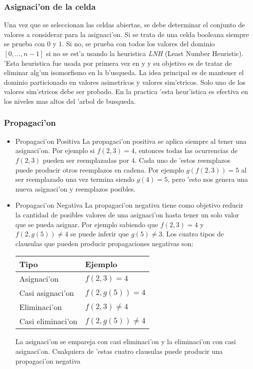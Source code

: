 \subsubsection{Asignaci'on de la celda}
Una vez que se seleccionan las celdas abiertas, se debe determinar el conjunto de valores a considerar para la asignaci'on. Si se trata de una celda booleana siempre se prueba con $0$ y $1$. Si no, se prueba con todos los valores del dominio $[0,\dots,n-1]$ si no se est'a usando la heuristica \textit{LNH} (Least Number Heuristic). 'Esta heuristica fue usada por primera vez en \cite{zhang96} y \cite{zhang} y su objetivo es de tratar de eliminar alg'un isomorfismo en la b'usqueda. La idea principal es de mantener el dominio particionado en valores asimetricos y valores sim'etricos. Solo uno de los valores sim'etricos debe ser probado. En la practica 'esta heur'istica es efectiva en los niveles mas altos del 'arbol de busqueda.


\subsubsection{Propagaci'on}

\begin{itemize}

\item{Propagaci'on Positiva}
La propagaci'on positiva se aplica siempre al tener una asignaci'on. Por ejemplo si $f(2,3)=4$, entonces todas las ocurrencias de $f(2,3)$ pueden ser reemplazadas por $4$. Cada uno de 'estos reemplazos puede producir otros reemplazos en cadena. Por ejemplo $g(f(2,3))=5$ al ser reemplazado una vez termina siendo $g(4)=5$, pero 'esto nos genera una nueva asignaci'on y reemplazos posibles.

\item{Propagaci'on Negativa}
La propagaci'on negativa tiene como objetivo reducir la cantidad de posibles valores de una asignaci'on hasta tener un solo valor que se pueda asignar. Por ejemplo sabiendo que $f(2,3)=4$ y $f(2, g(5))\neq4$ se puede inferir que $g(5)\neq3$. Los cuatro tipos de clausulas que pueden producir propagaciones negativas son:

\begin{tabular}{ |l|l| }
Tipo & Ejemplo \\
\hline
Asignaci'on & $f(2,3)=4$ \\
Casi asignaci'on & $f(2,g(5))=4$ \\
Eliminaci'on & $f(2,3)\neq4$ \\
Casi eliminaci'on & $f(2,g(5))\neq4$ \\
\hline
\end{tabular}

La asignaci'on se empareja con casi eliminaci'on y la eliminaci'on con casi asignaci'on. Cualquiera de 'estas cuatro clausulas puede producir una propagaci'on negativa

\end{itemize}
